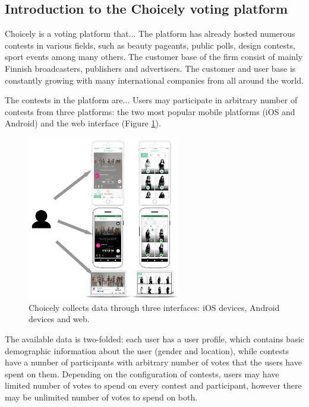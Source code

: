\subsection{Introduction to the Choicely voting platform}
    Choicely is a voting platform that... The platform has already hosted numerous contests in various fields, such as beauty pageants, public polls, design contests, sport events among many others. The customer base of the firm consist of mainly Finnish broadcasters, publishers and advertisers. The customer and user base is constantly growing with many international companies from all around the world.
    
    The contests in the platform are... Users may participate in arbitrary number of contests from three platforms: the two most popular mobile platforms (iOS and Android) and the web interface (Figure \ref{choicely_platforms}). 

    \begin{figure}[h] 
		\begin{center}
			\includegraphics[width=0.6\textwidth]{images/choicely_platforms.png}
			\caption{Choicely collects data through three interfaces: iOS devices, Android devices and web.}
			\label{choicely_platforms}
		\end{center}
	\end{figure}

    The available data is two-folded: each user has a user profile, which contains basic demographic information about the user (gender and location), while contests have a number of participants with arbitrary number of votes that the users have spent on them. Depending on the configuration of contests, users may have limited number of votes to spend on every contest and participant, however there may be unlimited number of votes to spend on both. 

